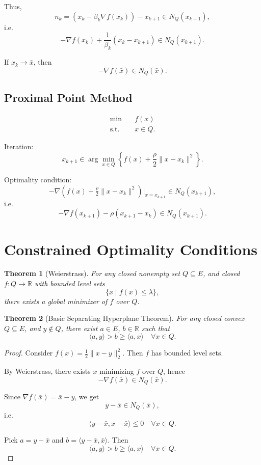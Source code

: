 \documentclass[12pt,oneside]{book}
\numberwithin{equation}{section}
\theoremstyle{definition}
\theoremstyle{plain}
\newtheorem{theorem}{Theorem}[section]
\theoremstyle{remark}
\begin{document}
Thus,
\[
n_k = (x_k - \beta_k \nabla f(x_k)) - x_{k+1} \in N_Q(x_{k+1}),
\]
i.e.
\[
-\nabla f(x_k) + \frac{1}{\beta_k}(x_k - x_{k+1}) \in N_Q(x_{k+1}).
\]

If $x_k \to \bar{x}$, then
\[
-\nabla f(\bar{x}) \in N_Q(\bar{x}).
\]

\subsection{Proximal Point Method}

\[
\begin{aligned}
\min \quad & f(x) \\
\text{s.t.} \quad & x \in Q.
\end{aligned}
\]

Iteration:
\[
x_{k+1} \in \arg\min_{x \in Q}
\left\{
f(x) + \frac{\rho}{2} \|x - x_k\|^2
\right\}.
\]

Optimality condition:
\[
-\nabla \left( f(x) + \tfrac{\rho}{2}\|x - x_k\|^2 \right)\big|_{x=x_{k+1}}
\in N_Q(x_{k+1}),
\]
i.e.
\[
-\nabla f(x_{k+1}) - \rho (x_{k+1} - x_k) \in N_Q(x_{k+1}).
\]

\section{Constrained Optimality Conditions}

\begin{theorem}[Weierstrass]
For any closed nonempty set $Q \subseteq E$, and closed $f:Q \to \mathbb{R}$ with bounded level sets
\[
\{x \mid f(x) \le \lambda\},
\]
there exists a global minimizer of $f$ over $Q$.
\end{theorem}

\begin{theorem}[Basic Separating Hyperplane Theorem]
For any closed convex $Q \subseteq E$, and $y \notin Q$, there exist $a \in E$, $b \in \mathbb{R}$ such that
\[
\langle a,y \rangle > b \ge \langle a,x \rangle \quad \forall x \in Q.
\]
\end{theorem}

\begin{proof}
Consider $f(x) = \tfrac{1}{2}\|x - y\|_2^2$. Then $f$ has bounded level sets.

By Weierstrass, there exists $\bar{x}$ minimizing $f$ over $Q$, hence
\[
-\nabla f(\bar{x}) \in N_Q(\bar{x}).
\]

Since $\nabla f(\bar{x}) = \bar{x} - y$, we get
\[
y - \bar{x} \in N_Q(\bar{x}),
\]
i.e.
\[
\langle y - \bar{x}, x - \bar{x} \rangle \le 0 \quad \forall x \in Q.
\]

Pick $a = y - \bar{x}$ and $b = \langle y - \bar{x}, \bar{x} \rangle$. Then
\[
\langle a,y \rangle > b \ge \langle a,x \rangle \quad \forall x \in Q.
\]
\end{proof}
\end{document}
